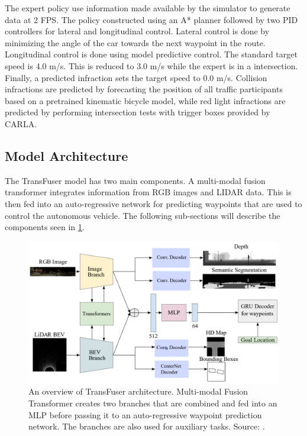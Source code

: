 The expert policy use information made available by the simulator to generate data at 2 FPS. The policy constructed using an A* planner followed by two PID controllers for lateral and longitudinal control. Lateral control is done by minimizing the angle of the car towards the next waypoint in the route. Longitudinal control is done using model predictive control. The standard target speed is 4.0 m/s. This is reduced to 3.0 m/s while the expert is in a intersection. Finally, a predicted infraction sets the target speed to 0.0 m/s. Collision infractions are predicted by forecasting the position of all traffic participants based on a pretrained kinematic bicycle model, while red light infractions are predicted by performing intersection tests with trigger boxes provided by CARLA.

\subsection{Model Architecture}
The TransFuser model has two main components. A multi-modal fusion transformer integrates information from RGB images and LIDAR data. This is then fed into an auto-regressive network for predicting waypoints that are used to control the autonomous vehicle. The following sub-sections will describe the components seen in \cref{fig:alt-transfuser-architecture}.

\begin{figure}
    \centering
    \includegraphics[width=\textwidth]{figures/3/transfuser.png}
    \caption{An overview of TransFuser architecture. Multi-modal Fusion Transformer creates two branches that are combined and fed into an MLP before passing it to an auto-regressive waypoint prediction network. The branches are also used for auxiliary tasks. Source: \cite{transfuser-pami}.}
    \label{fig:alt-transfuser-architecture}
\end{figure}

